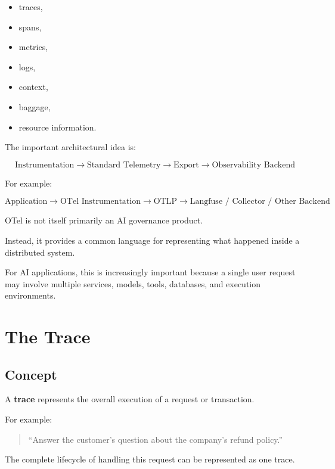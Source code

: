 \documentclass[11pt,a4paper]{article}
\begin{document}
\begin{itemize}
\item traces,
\item spans,
\item metrics,
\item logs,
\item context,
\item baggage,
\item resource information.
\end{itemize}

The important architectural idea is:

\[
\boxed{
\text{Instrumentation}
\rightarrow
\text{Standard Telemetry}
\rightarrow
\text{Export}
\rightarrow
\text{Observability Backend}
}
\]

For example:

\[
\text{Application}
\rightarrow
\text{OTel Instrumentation}
\rightarrow
\text{OTLP}
\rightarrow
\text{Langfuse / Collector / Other Backend}
\]

OTel is not itself primarily an AI governance product.

Instead, it provides a common language for representing what happened inside a distributed system.

For AI applications, this is increasingly important because a single user request may involve multiple services, models, tools, databases, and execution environments.

\section{The Trace}

\subsection{Concept}

A \textbf{trace} represents the overall execution of a request or transaction.

For example:

\begin{quote}
``Answer the customer's question about the company's refund policy.''
\end{quote}

The complete lifecycle of handling this request can be represented as one trace.
\end{document}
